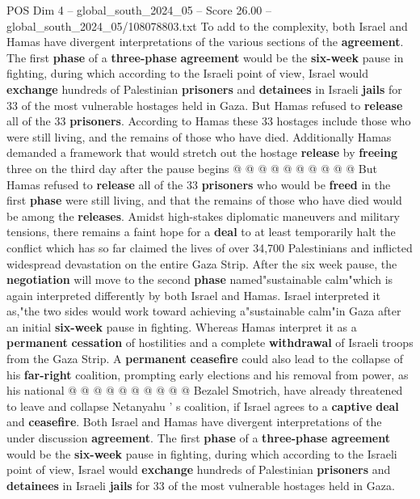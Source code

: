 \begin{textsample}{POS Dim 4 – global\_south\_2024\_05 – Score 26.00 – global\_south\_2024\_05/108078803.txt}
To add to the complexity, both Israel and Hamas have divergent interpretations of the various sections of the \textbf{agreement}.
The first \textbf{phase} of a \textbf{three-phase} \textbf{agreement} would be the \textbf{six-week} pause in fighting, during which according to the Israeli point of view, Israel would \textbf{exchange} hundreds of Palestinian \textbf{prisoners} and \textbf{detainees} in Israeli \textbf{jails} for 33 of the most vulnerable hostages held in Gaza.
But Hamas refused to \textbf{release} all of the 33 \textbf{prisoners}.
According to Hamas these 33 hostages include those who were still living, and the remains of those who have died.
Additionally Hamas demanded a framework that would stretch out the hostage \textbf{release} by \textbf{freeing} three on the third day after the pause begins @ @ @ @ @ @ @ @ @ @ But Hamas refused to \textbf{release} all of the 33 \textbf{prisoners} who would be \textbf{freed} in the first \textbf{phase} were still living, and that the remains of those who have died would be among the \textbf{releases}.
Amidst high-stakes diplomatic maneuvers and military tensions, there remains a faint hope for a \textbf{deal} to at least temporarily halt the conflict which has so far claimed the lives of over 34,700 Palestinians and inflicted widespread devastation on the entire Gaza Strip.
After the six week pause, the \textbf{negotiation} will move to the second \textbf{phase} named"sustainable calm"which is again interpreted differently by both Israel and Hamas.
Israel interpreted it as,"the two sides would work toward achieving a"sustainable calm"in Gaza after an initial \textbf{six-week} pause in fighting.
Whereas Hamas interpret it as a \textbf{permanent} \textbf{cessation} of hostilities and a complete \textbf{withdrawal} of Israeli troops from the Gaza Strip.
A \textbf{permanent} \textbf{ceasefire} could also lead to the collapse of his \textbf{far-right} coalition, prompting early elections and his removal from power, as his national @ @ @ @ @ @ @ @ @ @ Bezalel Smotrich, have already threatened to leave and collapse Netanyahu ' s coalition, if Israel agrees to a \textbf{captive} \textbf{deal} and \textbf{ceasefire}.
Both Israel and Hamas have divergent interpretations of the under discussion \textbf{agreement}.
The first \textbf{phase} of a \textbf{three-phase} \textbf{agreement} would be the \textbf{six-week} pause in fighting, during which according to the Israeli point of view, Israel would \textbf{exchange} hundreds of Palestinian \textbf{prisoners} and \textbf{detainees} in Israeli \textbf{jails} for 33 of the most vulnerable hostages held in Gaza.

\end{textsample}
